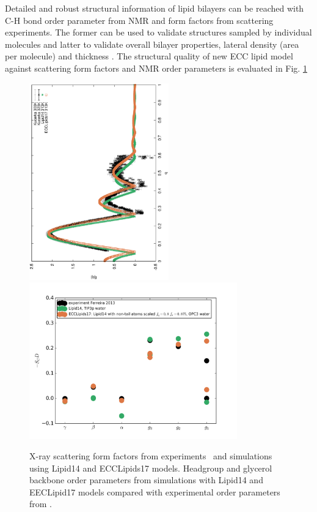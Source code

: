 \documentclass[aip,jcp,twocolumn]{revtex4}
\begin{document}
Detailed and robust structural information of lipid bilayers can
be reached with C-H bond order parameter from NMR and form factors from scattering
experiments. The former can be used to validate structures sampled by individual
molecules and latter to validate overall bilayer properties, lateral density
(area per molecule) and thickness \cite{ollila16}. The structural quality of
new ECC lipid model against scattering form factors and NMR order parameters
is evaluated in Fig. \ref{simVSexpNOions}
\begin{figure}[]
  \centering
  \includegraphics[height=8.5cm,angle=-90]{../Fig/form-f_exp-l14-eccl17.eps}
%
  \includegraphics[width=9.0cm]{../Fig/ipython_nb/Headgr_OPs_exp-L14-ECCL17.png}
  \caption{\label{simVSexpNOions}
    X-ray scattering form factors from experiments~\cite{Kucerka2011} and simulations using Lipid14 and ECCLipids17 models. 
    Headgroup and glycerol backbone order parameters from simulations with Lipid14 \cite{dickson14} and EECLipid17 models
    compared with experimental order parameters from \cite{ferreira13}.}
\end{figure}
\end{document}
